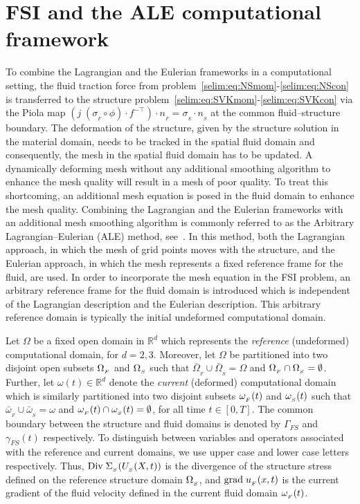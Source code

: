 \section{FSI and the ALE computational framework}
\label{selim:sec:ale}
To combine the Lagrangian and the Eulerian frameworks in a
computational setting, the fluid traction force from
problem~\eqref{selim:eq:NSmom}-\eqref{selim:eq:NScon} is transferred
to the structure
problem~\eqref{selim:eq:SVKmom}-\eqref{selim:eq:SVKcon} via the Piola
map $(j\; (\sigma_{_{F}}\circ \phi)\cdot f^{-\top})\cdot n_{_{F}} =
\sigma_{_{S}}\cdot n_{_{S}}$ at the common fluid--structure boundary.
The deformation of the structure, given by the structure solution in
the material domain, needs to be tracked in the spatial fluid domain
and consequently, the mesh in the spatial fluid domain has to be
updated. A dynamically deforming mesh without any additional smoothing
algorithm to enhance the mesh quality will result in a mesh of poor
quality. To treat this shortcoming, an additional mesh equation is
posed in the fluid domain to enhance the mesh quality. Combining the
Lagrangian and the Eulerian frameworks with an additional mesh
smoothing algorithm is commonly referred to as the Arbitrary
Lagrangian--Eulerian (ALE) method, see~\cite{DoneaGiulianiHalleux1982,
  DoneaHuertaPonthotEtAl2004}.  In this method, both the Lagrangian
approach, in which the mesh of grid points moves with the structure,
and the Eulerian approach, in which the mesh represents a fixed
reference frame for the fluid, are used. In order to incorporate the
mesh equation in the FSI problem, an arbitrary reference frame for the
fluid domain is introduced which is independent of the Lagrangian
description and the Eulerian description. This arbitrary reference
domain is typically the initial undeformed computational domain.

Let $\Omega$ be a fixed open domain in $\mathbb{R}^d$ which represents
the \emph{reference} (undeformed) computational domain, for
$d=2,3$. Moreover, let $\Omega$ be partitioned into two disjoint open
subsets $\Omega_{_{F}}$ and $\Omega_{_{S}}$ such that
$\bar{\Omega}_{_{F}}\cup\bar{\Omega}_{_{S}} = \Omega$ and
$\Omega_{_{F}}\cap\Omega_{_{S}}=\emptyset$. Further, let $\omega(t)\in\mathbb{R}^d$ denote
the \emph{current} (deformed) computational domain which is similarly
partitioned into two disjoint subsets $\omega_{_{F}}(t)$ and $\omega_{_{S}}(t)$ such that
$\bar{\omega}_{_{F}}\cup\bar{\omega}_{_{S}} = \omega$ and
$\omega_{_{F}}(t)\cap\omega_{_{S}}(t)=\emptyset$, for all time $t\in[0,T]$. The common
boundary between the structure and fluid domains is denoted by
$\Gamma_{FS}$ and $\gamma_{FS}(t)$ respectively. To distinguish
between variables and operators associated with the reference and
current domains, we use upper case and lower case letters
respectively. Thus, $\textrm{Div}\;\Sigma_{_{S}}(U_{_{S}}(X,t))$ is the divergence of the
structure stress defined on the reference structure domain $\Omega_{_{S}}$, and
$\textrm{grad}\;u_{_{F}}(x,t)$ is the current gradient of the fluid velocity defined
in the current fluid domain $\omega_{_{F}}(t)$.

